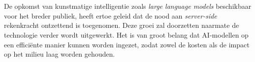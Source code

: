 
%
%
%
%
%

%



\chapter*{}

De opkomst van kunstmatige intelligentie zoals \textit{large language models} beschikbaar voor het breder publiek, heeft ertoe geleid dat de nood aan \textit{server-side} rekenkracht ontzettend is toegenomen. Deze groei zal doorzetten naarmate de technologie verder wordt uitgewerkt. Het is van groot belang dat AI-modellen op een efficiënte manier kunnen worden ingezet, zodat zowel de kosten als de impact op het milieu laag worden gehouden. 

